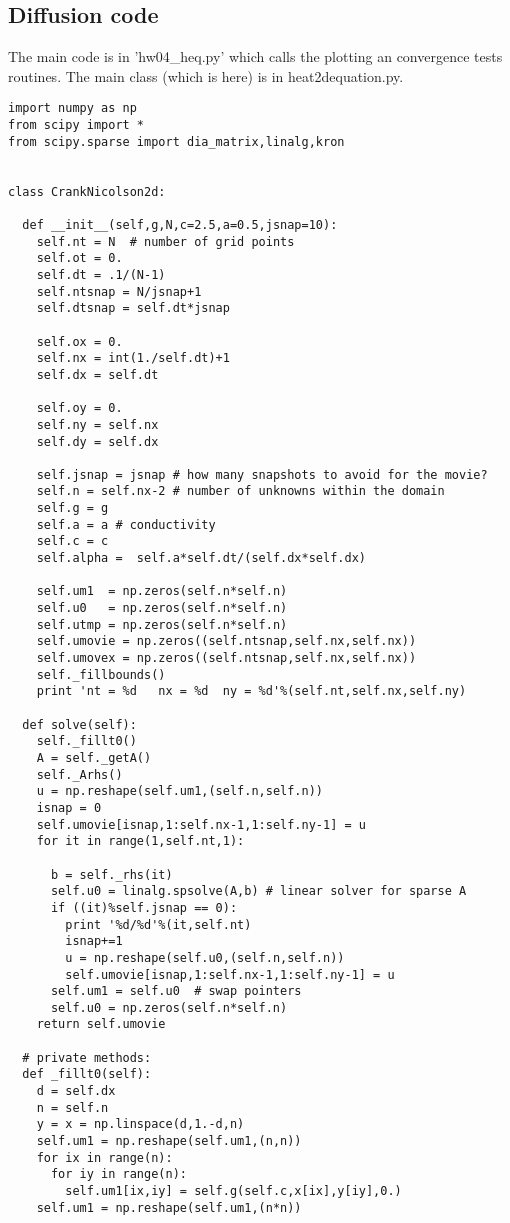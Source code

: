 \documentclass[10pt]{article}
\begin{document}
\subsection{Diffusion code}
The main code is in 'hw04\_heq.py' which calls the plotting an convergence tests routines.
The main class (which is here) is in heat2dequation.py.

\begin{verbatim}
import numpy as np
from scipy import *
from scipy.sparse import dia_matrix,linalg,kron


class CrankNicolson2d:

  def __init__(self,g,N,c=2.5,a=0.5,jsnap=10):
    self.nt = N  # number of grid points
    self.ot = 0.
    self.dt = .1/(N-1)
    self.ntsnap = N/jsnap+1
    self.dtsnap = self.dt*jsnap

    self.ox = 0.
    self.nx = int(1./self.dt)+1
    self.dx = self.dt

    self.oy = 0.
    self.ny = self.nx
    self.dy = self.dx

    self.jsnap = jsnap # how many snapshots to avoid for the movie?
    self.n = self.nx-2 # number of unknowns within the domain
    self.g = g
    self.a = a # conductivity
    self.c = c
    self.alpha =  self.a*self.dt/(self.dx*self.dx)

    self.um1  = np.zeros(self.n*self.n)    
    self.u0   = np.zeros(self.n*self.n)    
    self.utmp = np.zeros(self.n*self.n)    
    self.umovie = np.zeros((self.ntsnap,self.nx,self.nx)) 
    self.umovex = np.zeros((self.ntsnap,self.nx,self.nx)) 
    self._fillbounds()
    print 'nt = %d   nx = %d  ny = %d'%(self.nt,self.nx,self.ny)

  def solve(self):
    self._fillt0()
    A = self._getA()
    self._Arhs()
    u = np.reshape(self.um1,(self.n,self.n))
    isnap = 0
    self.umovie[isnap,1:self.nx-1,1:self.ny-1] = u
    for it in range(1,self.nt,1):

      b = self._rhs(it)       
      self.u0 = linalg.spsolve(A,b) # linear solver for sparse A
      if ((it)%self.jsnap == 0):
        print '%d/%d'%(it,self.nt)
        isnap+=1
        u = np.reshape(self.u0,(self.n,self.n))    
        self.umovie[isnap,1:self.nx-1,1:self.ny-1] = u
      self.um1 = self.u0  # swap pointers 
      self.u0 = np.zeros(self.n*self.n)
    return self.umovie

  # private methods:
  def _fillt0(self):
    d = self.dx
    n = self.n
    y = x = np.linspace(d,1.-d,n)
    self.um1 = np.reshape(self.um1,(n,n))
    for ix in range(n):  
      for iy in range(n):  
        self.um1[ix,iy] = self.g(self.c,x[ix],y[iy],0.) 
    self.um1 = np.reshape(self.um1,(n*n))


\end{verbatim}
\end{document}
